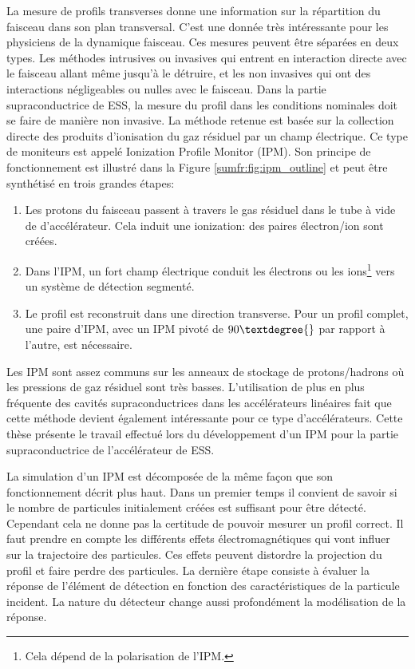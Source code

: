 La mesure de profils transverses donne une information sur la répartition du faisceau dans son plan transversal. C'est une donnée très intéressante pour les physiciens de la dynamique faisceau. Ces mesures peuvent être séparées en deux types. Les méthodes intrusives ou invasives qui entrent en interaction directe avec le faisceau allant même jusqu'à le détruire, et les non invasives qui ont des interactions négligeables ou nulles avec le faisceau. Dans la partie supraconductrice de ESS, la mesure du profil dans les conditions nominales doit se faire de manière non invasive. La méthode retenue est basée sur la collection directe des produits d'ionisation du gaz résiduel par un champ électrique. Ce type de moniteurs est appelé Ionization Profile Monitor (IPM). Son principe de fonctionnement est illustré dans la Figure \ref{sumfr:fig:ipm_outline} et peut être synthétisé en trois grandes étapes:

\begin{enumerate}
  \item Les protons du faisceau passent à travers le gas résiduel dans le tube à vide de d'accélérateur. Cela induit une ionization: des paires électron/ion sont créées.
  \item Dans l'IPM, un fort champ électrique conduit les électrons ou les ions\footnote{Cela dépend de la polarisation de l'IPM.} vers un système de détection segmenté.
  \item Le profil est reconstruit dans une direction transverse. Pour un profil complet, une paire d'IPM, avec un IPM pivoté de $90\textdegree{}$ par rapport à l'autre, est nécessaire.
\end{enumerate}
Les IPM sont assez communs sur les anneaux de stockage de protons/hadrons où les pressions de gaz résiduel sont très basses. L’utilisation de plus en plus fréquente des cavités supraconductrices dans les accélérateurs linéaires fait que cette méthode devient également intéressante pour ce type d'accélérateurs. Cette thèse présente le travail effectué lors du développement d’un IPM pour la partie supraconductrice de l’accélérateur de ESS.

La simulation d’un IPM est décomposée de la même façon que son fonctionnement décrit plus haut. Dans un premier temps il convient de savoir si le nombre de particules initialement créées est suffisant pour être détecté. Cependant cela ne donne pas la certitude de pouvoir mesurer un profil correct. Il faut prendre en compte les différents effets électromagnétiques qui vont influer sur la trajectoire des particules. Ces effets peuvent distordre la projection du profil et faire perdre des particules. La dernière étape consiste à évaluer la réponse de l'élément de détection en fonction des caractéristiques de la particule incident. La nature du détecteur change aussi profondément la modélisation de la réponse.

